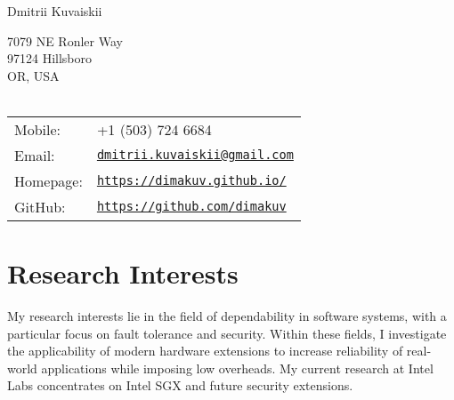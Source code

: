 \documentclass[letterpaper]{article}
\def\name{Dmitrii Kuvaiskii}
\begin{document}
{\huge \name}



\begin{minipage}{0.45\linewidth}
\vspace{0.1in}
7079 NE Ronler Way\\
97124 Hillsboro\\
OR, USA\\
\\

 
\end{minipage}
\begin{minipage}{0.45\linewidth}
  \begin{tabular}{ll}
      Mobile: & +1 (503) 724 6684\\
      Email: & \href{mailto:dmitrii.kuvaiskii@gmail.com}{\tt dmitrii.kuvaiskii@gmail.com} \\
    Homepage: & \href{https://dimakuv.github.io/}{\tt https://dimakuv.github.io/} \\
    GitHub: & \href{https://github.com/dimakuv}{\tt https://github.com/dimakuv} \\
  \end{tabular}
\end{minipage}


\section*{Research Interests}

My research interests lie in the field of dependability in software systems, with a particular focus on fault tolerance and security. Within these fields, I investigate the applicability of modern hardware extensions to increase reliability of real-world applications while imposing low overheads. My current research at Intel Labs concentrates on Intel SGX and future security extensions.

\end{document}
